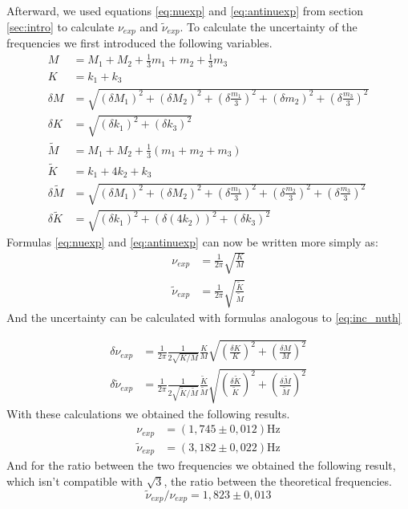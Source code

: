 \documentclass{article}
\begin{document}
Afterward, we used equations \ref{eq:nuexp} and \ref{eq:antinuexp} from section \ref{sec:intro} to calculate
$\nu_{exp}$ and $\tilde \nu_{exp}$. To calculate the uncertainty of the frequencies we first introduced the following variables.
\begin{align}
    M &= M_1 + M_2 + \frac{1}{3} m_1 + m_2 + \frac{1}{3}m_3\\
    K &= k_1 + k_3 \\
    \delta M &= \sqrt{
        ( \delta M_1)^2 + ( \delta M_2)^2 + 
        ( \delta \frac{m_1}{3} )^2 + ( \delta m_2)^2 + 
        ( \delta \frac{m_3}{3} )^2} \\
    \delta K &= \sqrt{
        ( \delta k_1)^2 + ( \delta k_3)^2 } \\
    \tilde M &= M_1 + M_2 + \frac{1}{3} (m_1 + m_2 + m_3) \\
    \tilde K &= k_1 +4k_2 +k_3 \\
    \delta \tilde M &= \sqrt{
        ( \delta M_1)^2 + ( \delta M_2)^2 + 
        ( \delta \frac{m_1}{3} )^2 + 
        ( \delta \frac{m_2}{3} )^2 +
        ( \delta \frac{m_3}{3} )^2} \\
    \delta \tilde K &= \sqrt{
        ( \delta k_1)^2 + ( \delta (4k_2))^2 + 
        ( \delta k_3)^2 } 
\end{align}
Formulas \ref{eq:nuexp} and \ref{eq:antinuexp} can now be written more simply as:
\begin{align}
    \nu_{exp} &= \frac{1}{2\pi}   \sqrt{\frac{ K}{M}} \\
    \tilde \nu_{exp} &= \frac{1}{2\pi}   \sqrt{
    \frac{\tilde K}{\tilde M}  }
\end{align}
And the uncertainty can be calculated with formulas analogous to \ref{eq:inc_nuth}


\begin{align}
\delta \nu_{exp} &= \frac{1}{2\pi} 
        \frac{1}{2\sqrt{K/M}}  \frac{K}{M} 
        \sqrt{ \left ( \frac{ \delta K}{K}  \right ) ^2 +
               \left ( \frac{ \delta M}{M}  \right ) ^2  } \\
    \delta \tilde \nu_{exp} &= \frac{1}{2\pi} 
        \frac{1}{2\sqrt{\tilde K/\tilde M}}  \frac{\tilde K}{\tilde M} 
        \sqrt{ \left ( \frac{ \delta \tilde K}{\tilde K}  \right ) ^2 +
               \left ( \frac{ \delta \tilde M}{\tilde M}  \right ) ^2  } 
\end{align}
With these calculations we obtained the following results.
\begin{align}
           \nu_{exp} &= (1,745 \pm 0,012) \text{Hz}\\
    \tilde \nu_{exp} &= (3,182 \pm 0,022) \text{Hz}
\end{align}
And for the ratio between the two frequencies we obtained the following result, which isn't compatible with $\sqrt 3$, the ratio between the theoretical frequencies. 
\begin{equation}
    \tilde \nu_{exp} / \nu_{exp} = 1,823 \pm 0,013
\end{equation}
\end{document}
